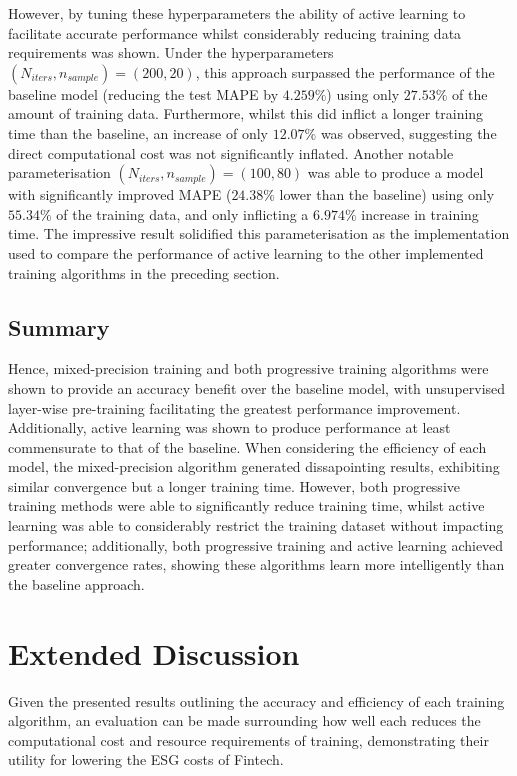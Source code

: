 \documentclass[a4paper, 11pt]{report}
\begin{document}
    However, by tuning these hyperparameters the ability of active learning to facilitate accurate performance whilst considerably reducing training data requirements was shown. Under the hyperparameters $(N_{iters}, n_{sample}) = (200, 20)$, this approach surpassed the performance of the baseline model (reducing the test MAPE by $4.259\%$) using only $27.53\%$ of the amount of training data. Furthermore, whilst this did inflict a longer training time than the baseline, an increase of only $12.07\%$ was observed, suggesting the direct computational cost was not significantly inflated. Another notable parameterisation $(N_{iters}, n_{sample}) = (100, 80)$ was able to produce a model with significantly improved MAPE ($24.38\%$ lower than the baseline) using only $55.34\%$ of the training data, and only inflicting a $6.974\%$ increase in training time. The impressive result solidified this parameterisation as the implementation used to compare the performance of active learning to the other implemented training algorithms in the preceding section.


    \subsection{Summary}

    Hence, mixed-precision training and both progressive training algorithms were shown to provide an accuracy benefit over the baseline model, with unsupervised layer-wise pre-training facilitating the greatest performance improvement. Additionally, active learning was shown to produce performance at least commensurate to that of the baseline. When considering the efficiency of each model, the mixed-precision algorithm generated dissapointing results, exhibiting similar convergence but a longer training time. However, both progressive training methods were able to significantly reduce training time, whilst active learning was able to considerably restrict the training dataset without impacting performance; additionally, both progressive training and active learning achieved greater convergence rates, showing these algorithms learn more intelligently than the baseline approach.


    \section{Extended Discussion}

    Given the presented results outlining the accuracy and efficiency of each training algorithm, an evaluation can be made surrounding how well each reduces the computational cost and resource requirements of training, demonstrating their utility for lowering the ESG costs of Fintech.
\end{document}
